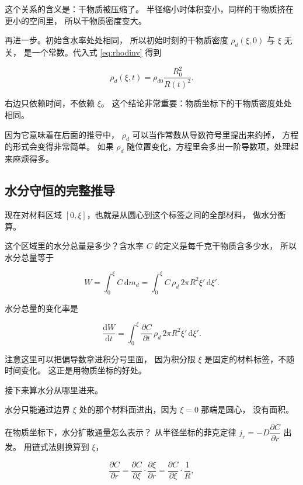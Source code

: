 这个关系的含义是：干物质被压缩了。
半径缩小时体积变小，同样的干物质挤在更小的空间里，
所以干物质密度变大。

再进一步。初始含水率处处相同，
所以初始时刻的干物质密度 $\rho_d(\xi,0)$ 与 $\xi$ 无关，
是一个常数。代入式 \eqref{eq:rhodinv} 得到

\begin{equation}
\rho_d(\xi,t) = \rho_{d0}\frac{R_0^2}{R(t)^2} .
\label{eq:rhodconst}
\end{equation}

右边只依赖时间，不依赖 $\xi$。
这个结论非常重要：物质坐标下的干物质密度处处相同。

因为它意味着在后面的推导中，
$\rho_d$ 可以当作常数从导数符号里提出来约掉，
方程的形式会变得非常简单。
如果 $\rho_d$ 随位置变化，方程里会多出一阶导数项，处理起来麻烦得多。

\subsection{水分守恒的完整推导}

现在对材料区域 $[0,\xi]$，也就是从圆心到这个标签之间的全部材料，
做水分衡算。

这个区域里的水分总量是多少？含水率 $C$ 的定义是每千克干物质含多少水，
所以水分总量等于

\begin{equation}
W = \int_0^\xi C\,\mathrm{d}m_d
= \int_0^\xi C\,\rho_d\,2\pi R^2\xi'\,\mathrm{d}\xi' .
\end{equation}

水分总量的变化率是

\begin{equation}
\frac{\mathrm{d}W}{\mathrm{d}t}
= \int_0^\xi \frac{\partial C}{\partial t}\,\rho_d\,2\pi R^2\xi'\,\mathrm{d}\xi' .
\label{eq:dWdt}
\end{equation}

注意这里可以把偏导数拿进积分号里面，
因为积分限 $\xi$ 是固定的材料标签，不随时间变化。
这正是用物质坐标的好处。

接下来算水分从哪里进来。

水分只能通过边界 $\xi$ 处的那个材料面进出，因为 $\xi=0$ 那端是圆心，
没有面积。

在物质坐标下，水分扩散通量怎么表示？
从半径坐标的菲克定律 $j_r = -D\dfrac{\partial C}{\partial r}$ 出发。
用链式法则换算到 $\xi$，

\begin{equation}
\frac{\partial C}{\partial r}
= \frac{\partial C}{\partial \xi}\cdot\frac{\partial \xi}{\partial r}
= \frac{\partial C}{\partial \xi}\cdot\frac{1}{R},
\end{equation}

